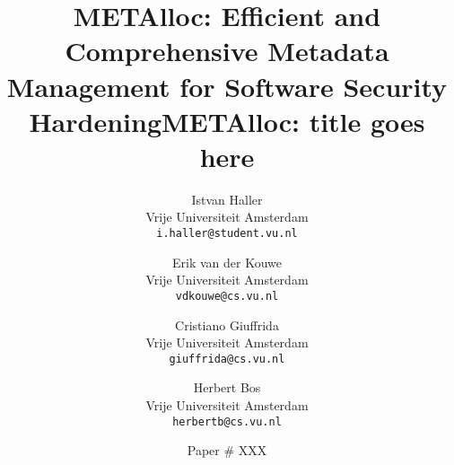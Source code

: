 \documentclass[10pt,twocolumn]{\paperdocumentclass}
\newcommand{\projectname}[0]{METAlloc}
\begin{document}
\ifdefined\isworkshoppaper
\title{\projectname{}: Efficient and Comprehensive Metadata Management for Software Security Hardening}
\else
\title{\bf \projectname{}: title goes here} %
\fi

\ifdefined\isworkshoppaper
\author{
	Istvan Haller \\ Vrije Universiteit Amsterdam \\ \texttt{i.haller@student.vu.nl} \and 
	Erik van der Kouwe \\ Vrije Universiteit Amsterdam \\ \texttt{vdkouwe@cs.vu.nl} \and 
	Cristiano Giuffrida \\ Vrije Universiteit Amsterdam \\ \texttt{giuffrida@cs.vu.nl} \and 
	Herbert Bos \\ Vrije Universiteit Amsterdam \\ \texttt{herbertb@cs.vu.nl}}
\else
\author{Paper \# XXX} %
\fi

\date{}
\maketitle
\thispagestyle{empty}











\end{document}
